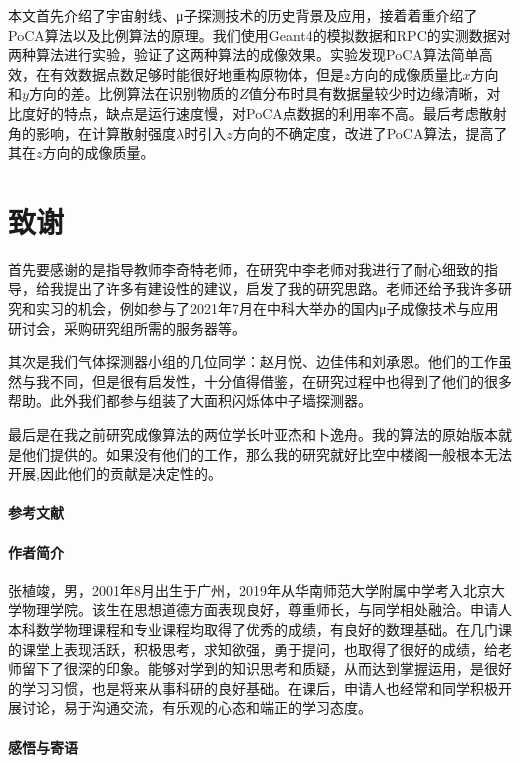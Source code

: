 \documentclass[fontset=none,zihao=-4]{ctexart}
\begin{document}
本文首先介绍了宇宙射线、μ子探测技术的历史背景及应用，接着着重介绍了PoCA算法以及比例算法的原理。我们使用Geant4的模拟数据和RPC的实测数据对两种算法进行实验，验证了这两种算法的成像效果。实验发现PoCA算法简单高效，在有效数据点数足够时能很好地重构原物体，但是$z$方向的成像质量比$x$方向和$y$方向的差。比例算法在识别物质的$Z$值分布时具有数据量较少时边缘清晰，对比度好的特点，缺点是运行速度慢，对PoCA点数据的利用率不高。最后考虑散射角的影响，在计算散射强度$\lambda$时引入$z$方向的不确定度，改进了PoCA算法，提高了其在$z$方向的成像质量。

\section*{ 致谢}

首先要感谢的是指导教师李奇特老师，在研究中李老师对我进行了耐心细致的指导，给我提出了许多有建设性的建议，启发了我的研究思路。老师还给予我许多研究和实习的机会，例如参与了2021年7月在中科大举办的国内μ子成像技术与应用研讨会，采购研究组所需的服务器等。

其次是我们气体探测器小组的几位同学：赵月悦、边佳伟和刘承恩。他们的工作虽然与我不同，但是很有启发性，十分值得借鉴，在研究过程中也得到了他们的很多帮助。此外我们都参与组装了大面积闪烁体中子墙探测器。

最后是在我之前研究成像算法的两位学长叶亚杰和卜逸舟。我的算法的原始版本就是他们提供的。如果没有他们的工作，那么我的研究就好比空中楼阁一般根本无法开展,因此他们的贡献是决定性的。

\paragraph*{参考文献}

\printbibliography[heading=none]

\paragraph*{作者简介}

张植竣，男，2001年8月出生于广州，2019年从华南师范大学附属中学考入北京大学物理学院。该生在思想道德方面表现良好，尊重师长，与同学相处融洽。申请人本科数学物理课程和专业课程均取得了优秀的成绩，有良好的数理基础。在几门课的课堂上表现活跃，积极思考，求知欲强，勇于提问，也取得了很好的成绩，给老师留下了很深的印象。能够对学到的知识思考和质疑，从而达到掌握运用，是很好的学习习惯，也是将来从事科研的良好基础。在课后，申请人也经常和同学积极开展讨论，易于沟通交流，有乐观的心态和端正的学习态度。

\paragraph*{感悟与寄语}
\end{document}
